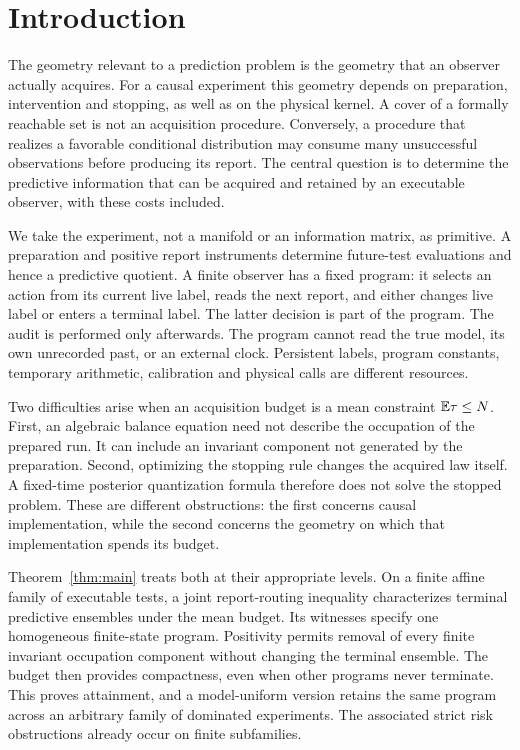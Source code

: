 \section{Introduction}
The geometry relevant to a prediction problem is the geometry that an observer actually acquires. For a causal experiment this geometry depends on preparation, intervention and stopping, as well as on the physical kernel. A cover of a formally reachable set is not an acquisition procedure. Conversely, a procedure that realizes a favorable conditional distribution may consume many unsuccessful observations before producing its report. The central question is to determine the predictive information that can be acquired and retained by an executable observer, with these costs included.

We take the experiment, not a manifold or an information matrix, as primitive. A preparation and positive report instruments determine future-test evaluations and hence a predictive quotient. A finite observer has a fixed program: it selects an action from its current live label, reads the next report, and either changes live label or enters a terminal label. The latter decision is part of the program. The audit is performed only afterwards. The program cannot read the true model, its own unrecorded past, or an external clock. Persistent labels, program constants, temporary arithmetic, calibration and physical calls are different resources.

Two difficulties arise when an acquisition budget is a mean constraint $\mathbb E\tau\le N$. First, an algebraic balance equation need not describe the occupation of the prepared run. It can include an invariant component not generated by the preparation. Second, optimizing the stopping rule changes the acquired law itself. A fixed-time posterior quantization formula therefore does not solve the stopped problem. These are different obstructions: the first concerns causal implementation, while the second concerns the geometry on which that implementation spends its budget.

Theorem~\ref{thm:main} treats both at their appropriate levels. On a finite affine family of executable tests, a joint report-routing inequality characterizes terminal predictive ensembles under the mean budget. Its witnesses specify one homogeneous finite-state program. Positivity permits removal of every finite invariant occupation component without changing the terminal ensemble. The budget then provides compactness, even when other programs never terminate. This proves attainment, and a model-uniform version retains the same program across an arbitrary family of dominated experiments. The associated strict risk obstructions already occur on finite subfamilies.


